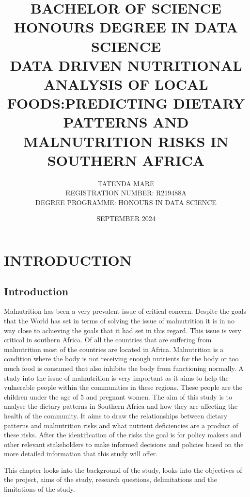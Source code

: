 \documentclass[a4paper,11pt]{report}
\title{BACHELOR OF SCIENCE HONOURS DEGREE IN DATA SCIENCE\\
	DATA DRIVEN NUTRITIONAL ANALYSIS OF LOCAL FOODS:PREDICTING DIETARY PATTERNS AND MALNUTRITION RISKS IN SOUTHERN AFRICA}
\author{TATENDA MARE\\
	REGISTRATION NUMBER: R219488A\\
	DEGREE PROGRAMME: HONOURS IN DATA SCIENCE}
\date{SEPTEMBER 2024}
\begin{document}
	
	\maketitle
	
	
	\newpage
	
	\tableofcontents
	
	\newpage
	
	
	\chapter{INTRODUCTION}
	\section{Introduction}
Malnutrition has been a very prevalent issue of critical concern. Despite the goals that the World has set in terms of solving the issue of malnutrition it is in no way close to achieving the goals that it had set in this regard. This issue is very critical in southern Africa. Of all the countries that are suffering from malnutrition most of the countries are located in Africa. Malnutrition is a condition where the body is not receiving enough nutrients for the body or too much food is consumed that also inhibits the body from functioning normally. A study into the issue of malnutrition is very important as it aims to help the vulnerable people within the communities in these regions. These people are the children under the age of 5 and pregnant women. The aim of this study is to analyse the dietary patterns in Southern Africa and how they are affecting the health of the community. It aims to draw the relationships between dietary patterns and malnutrition risks and what nutrient deficiencies are a product of these risks. After the identification of the risks the goal is for policy makers and other relevant stakeholders to make informed decisions and policies based on the more detailed information that this study will offer.
	\par This chapter looks into the background of the study, looks into the objectives of the project, aims of the study, research questions, delimitations and the limitations of the study.
	
\end{document}
